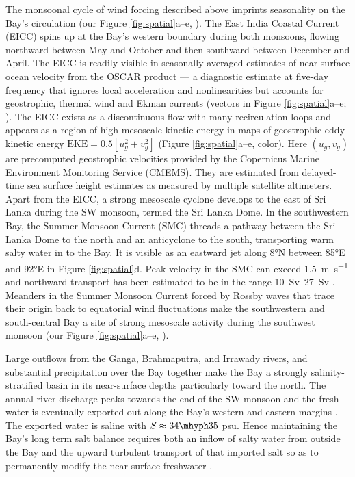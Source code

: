 \documentclass[twocol]{ametsoc}
\begin{document}
The monsoonal cycle of wind forcing described above imprints seasonality on the Bay's circulation (our Figure \ref{fig:spatial}a--e, \citealp{Schott2002,Shankar2002}).
The East India Coastal Current (EICC) spins up at the Bay's western boundary during both monsoons, flowing northward between May and October and then southward between December and April.
The EICC is readily visible in seasonally-averaged estimates of near-surface ocean velocity from the OSCAR product --- a diagnostic estimate at five-day frequency that ignores local acceleration and nonlinearities but accounts for geostrophic, thermal wind and Ekman currents (vectors in Figure \ref{fig:spatial}a--e; \citealp{Bonjean2002}).
The EICC exists as a discontinuous flow with many recirculation loops \citep{Durand2009} and appears as a region of high mesoscale kinetic energy in maps of geostrophic eddy kinetic energy \(\text{EKE} = 0.5[u_g^2 + v_g^2]\) (Figure \ref{fig:spatial}a--e, color).
Here \((u_g, v_g)\) are precomputed geostrophic velocities provided by the Copernicus Marine Environment Monitoring Service (CMEMS).
They are estimated from delayed-time sea surface height estimates as measured by multiple satellite altimeters.
Apart from the EICC, a strong mesoscale cyclone develops to the east of Sri Lanka during the SW monsoon, termed the Sri Lanka Dome.
In the southwestern Bay, the Summer Monsoon Current (SMC) threads a pathway between the Sri Lanka Dome to the north and an anticyclone to the south, transporting warm salty water in to the Bay.
It is visible as an eastward jet along 8°N between 85°E and 92°E in Figure \ref{fig:spatial}d.
Peak velocity in the SMC can exceed \SI{1.5}{\meter\per\second} and northward transport has been estimated to be in the range \SIrange{10}{27}{Sv} \citep{Wijesekera2016,Vinayachandran1999,Webber2018}.
Meanders in the Summer Monsoon Current forced by Rossby waves that trace their origin back to equatorial wind fluctuations make the southwestern and south-central Bay a site of strong mesoscale activity during the southwest monsoon (our Figure \ref{fig:spatial}a--e, \citealp{Vinayachandran1998,Chen2018}).

Large outflows from the Ganga, Brahmaputra, and Irrawady rivers, and substantial precipitation over the Bay together make the Bay a strongly salinity-stratified basin in its near-surface depths particularly toward the north.
The annual river discharge peaks towards the end of the SW monsoon and the fresh water is eventually exported out along the Bay's western and eastern margins \citep{Sengupta2006}.
The exported water is saline with \(S \approx 34 \mhyph 35\) \si{psu}.
Hence maintaining the Bay's long term salt balance requires both an inflow of salty water from outside the Bay and the upward turbulent transport of that imported salt so as to permanently modify the near-surface freshwater \citep{Vinayachandran2013}.
\end{document}
